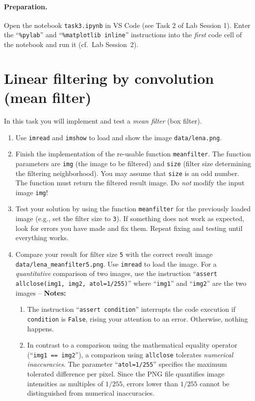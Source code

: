\documentclass[12pt,a4paper]{article}
\begin{document}
\paragraph{Preparation.} Open the notebook \texttt{task3.ipynb} in VS Code (see Task 2 of Lab Session 1). Enter the ``\texttt{\%pylab}'' and ``\texttt{\%matplotlib inline}'' instructions into the \emph{first} code cell of the notebook and run it (cf.\ Lab Session~2).

\section{Linear filtering by convolution (mean filter)}
\label{task:boxfilter}
In this task you will implement and test a \emph{mean filter} (box filter).
\begin{enumerate}
    \item Use \texttt{imread} and \texttt{imshow} to load and show the image \texttt{data/lena.png}.
    \item Finish the implementation of the re-usable function \texttt{meanfilter}. The function parameters are \texttt{img} (the image to be filtered) and \texttt{size} (filter size determining the filtering neighborhood). You may assume that \texttt{size} is an odd number. The function must return the filtered result image. Do \emph{not} modify the input image \texttt{img}!
    \item Test your solution by using the function \texttt{meanfilter} for the previously loaded image (e.g., set the filter size to \texttt{3}). If something does not work as expected, look for errors you have made and fix them. Repeat fixing and testing until everything works.
    \item Compare your result for filter size \texttt{5} with the correct result image \texttt{data/lena\_mean\-fil\-ter5.png}. Use \texttt{imread} to load the image. For a \emph{quantitative} comparison of two images, use the instruction ``\texttt{assert allclose(img1, img2, atol=1/255)}'' where ``\texttt{img1}'' and ``\texttt{img2}'' are the two images -- \textbf{Notes:}
    \begin{enumerate}
        \item The instruction ``\texttt{assert condition}'' interrupts the code execution if \texttt{condition} is \texttt{False}, rising your attention to an error. Otherwise, nothing happens.
        \item In contrast to a comparison using the mathematical equality operator (``\texttt{img1 == img2}''), a comparison using \texttt{allclose} tolerates \emph{numerical inaccuracies}. The parameter ``\texttt{atol=1/255}'' specifies the maximum tolerated difference per pixel. Since the PNG file quantifies image intensities as multiples of $1/255$, errors lower than $1/255$ cannot be distinguished from numerical inaccuracies.
    \end{enumerate}
\end{enumerate}
\end{document}
